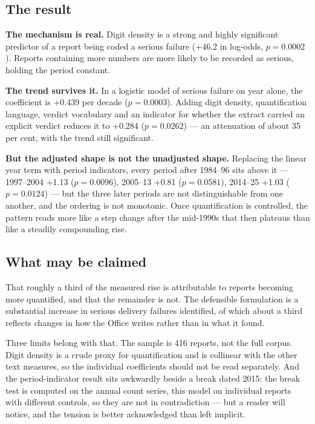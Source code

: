 \subsection*{The result}

\textbf{The mechanism is real.} Digit density is a strong and highly significant predictor of a
report being coded a serious failure (+46.2 in log-odds, $p=0.0002$). Reports containing more
numbers are more likely to be recorded as serious, holding the period constant.

\textbf{The trend survives it.} In a logistic model of serious failure on year alone, the
coefficient is +0.439 per decade ($p=0.0003$). Adding digit density, quantification language, verdict
vocabulary and an indicator for whether the extract carried an explicit verdict reduces it to
+0.284 ($p=0.0262$) --- an attenuation of about 35 per cent, with the trend still significant.

\textbf{But the adjusted shape is not the unadjusted shape.} Replacing the linear year term with
period indicators, every period after 1984--96 sits above it --- 1997--2004 +1.13 ($p=0.0096$),
2005--13 +0.81 ($p=0.0581$), 2014--25 +1.03 ($p=0.0124$) --- but the three later periods are not
distinguishable from one another, and the ordering is not monotonic. Once quantification is
controlled, the pattern reads more like a step change after the mid-1990s that then plateaus
than like a steadily compounding rise.

\subsection*{What may be claimed}

That roughly a third of the measured rise is attributable to reports becoming more quantified,
and that the remainder is not. The defensible formulation is a substantial increase in serious
delivery failures identified, of which about a third reflects changes in how the Office writes
rather than in what it found.

Three limits belong with that. The sample is 416 reports, not the full corpus. Digit density is a
crude proxy for quantification and is collinear with the other text measures, so the individual
coefficients should not be read separately. And the period-indicator result sits awkwardly beside
a break dated 2015: the break test is computed on the annual count series, this model on
individual reports with different controls, so they are not in contradiction --- but a reader
will notice, and the tension is better acknowledged than left implicit.

